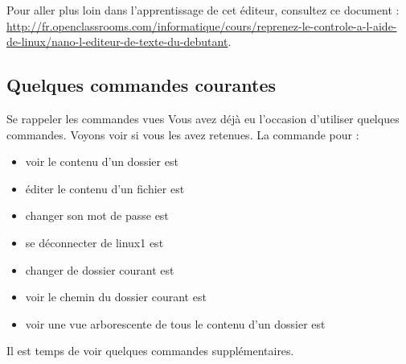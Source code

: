 \documentclass[a4paper,11pt]{style-esi/td}
\begin{document}
		Pour aller plus loin dans l'apprentissage de cet éditeur,
		consultez ce document :\\
		{\tiny\url{http://fr.openclassrooms.com/informatique/cours/reprenez-le-controle-a-l-aide-de-linux/nano-l-editeur-de-texte-du-debutant}}.

	\subsection{Quelques commandes courantes}

	\begin{Exercice}{Se rappeler les commandes vues}		
		Vous avez déjà eu l'occasion d'utiliser quelques commandes. 
		Voyons voir si vous les avez retenues.
		La commande pour :
		\begin{itemize}
		\item voir le contenu d'un dossier est  
		\item éditer le contenu d'un fichier est  
		\item changer son mot de passe est  
		\item se déconnecter de linux1 est  
		\item changer de dossier courant est  
		\item voir le chemin du dossier courant est  
		\item voir une vue arborescente de tous le contenu d'un dossier est  
		\end{itemize}
	\end{Exercice}

	Il est temps de voir quelques commandes supplémentaires.
\end{document}

